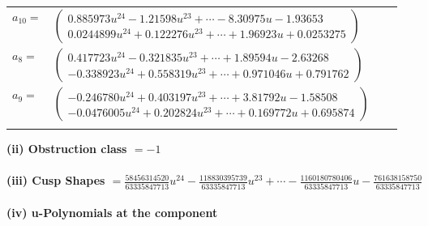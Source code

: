 \documentclass[1p]{elsarticle_modified}
\theoremstyle{definition}
\begin{document}
\begin{tabular}{m{7pt} m{180pt} m{7pt} m{180pt} }
\flushright $a_{10}=$&$\begin{pmatrix}0.885973 u^{24}-1.21598 u^{23}+\cdots-8.30975 u-1.93653\\0.0244899 u^{24}+0.122276 u^{23}+\cdots+1.96923 u+0.0253275\end{pmatrix}$ \\
\flushright $a_{8}=$&$\begin{pmatrix}0.417723 u^{24}-0.321835 u^{23}+\cdots+1.89594 u-2.63268\\-0.338923 u^{24}+0.558319 u^{23}+\cdots+0.971046 u+0.791762\end{pmatrix}$ \\
\flushright $a_{9}=$&$\begin{pmatrix}-0.246780 u^{24}+0.403197 u^{23}+\cdots+3.81792 u-1.58508\\-0.0476005 u^{24}+0.202824 u^{23}+\cdots+0.169772 u+0.695874\end{pmatrix}$\\&\end{tabular}
\flushleft \textbf{(ii) Obstruction class $= -1$}\\~\\
\flushleft \textbf{(iii) Cusp Shapes $= \frac{58456314520}{63335847713} u^{24}-\frac{118830395739}{63335847713} u^{23}+\cdots-\frac{1160180780406}{63335847713} u-\frac{761638158750}{63335847713}$}\\~\\
\newpage\renewcommand{\arraystretch}{1}
\flushleft \textbf{(iv) u-Polynomials at the component}\newline \\
\end{document}
